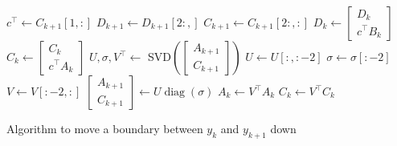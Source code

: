 \documentclass[doctype=mastersthesis,BCOR=15mm,biblatex]{ldvbook}%
\DeclareMathOperator{\diag}{diag}
\begin{document}
\begin{algorithm}[htb]
	\begin{algorithmic}
		\State $c^\top \gets C_{k+1}[1,:]$
		\State $D_{k+1} \gets D_{k+1}[2:,]$
		\State $C_{k+1} \gets C_{k+1}[2:,:]$
		\State $D_k \gets \begin{bmatrix} D_k\\c^\top B_k	\end{bmatrix}$
		\State $C_k \gets \begin{bmatrix} C_k\\c^\top A_k	\end{bmatrix}$
		\State $U,\sigma,V^\top \gets$ SVD$\left(\begin{bmatrix} A_{k+1}\\C_{k+1}	\end{bmatrix}\right)$ 
		\State $U \gets U[:,:-2]$
		\State $\sigma \gets \sigma[:-2]$
		\State $V \gets V[:-2,:]$
		\State$\begin{bmatrix} A_{k+1}\\C_{k+1}	\end{bmatrix} \gets U\diag(\sigma)$
		\State$A_{k} \gets V^\top A_{k}$
		\State$C_{k} \gets V^\top C_{k}$
		\EndIf
	\end{algorithmic}
	\caption{Algorithm to move a boundary between $y_k$ and $y_{k+1}$ down}\label{alg:move_down}
\end{algorithm}
\end{document}
